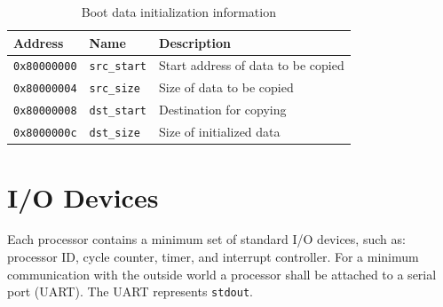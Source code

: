 \documentclass[a4paper,fontsize=10pt,twoside,DIV15,BCOR12mm,headinclude=true,footinclude=false,pagesize,bibtotoc]{scrbook}
\newcommand{\code}[1]{{\texttt{#1}}}
\newcommand{\comment}[3]{

\textsf{\textbf{#1}} {\color{#3}#2}}
\newcommand{\stefan}[1]{\comment{Stefan}{#1}{RoyalPurple}}
\renewcommand{\stefan}[1]{}
\begin{document}
\begin{table}
\centering
\begin{tabular}{lll}
\toprule
Address & Name & Description \\
\midrule
\code{0x80000000} & \code{src\_start} & Start address of data to be copied \\
\code{0x80000004} & \code{src\_size} & Size of data to be copied \\
\code{0x80000008} & \code{dst\_start} & Destination for copying \\
\code{0x8000000c} & \code{dst\_size} & Size of initialized data \\
\bottomrule
\end{tabular}
\caption{Boot data initialization information}
\label{tab:bootrommap}
\end{table}


\stefan{We discussed about making the stack cache memory mapped, like the SPM. The disadvantage is that
we need to reserve an additional register for the stack pointer of the stack cache. s5 (the stack cache spill pointer) must point into a main
memory address range. s6 (the stack top pointer) must point to the top of the stack cache in the cache address range and must be modifiable
(for context switching). An additional s7 must either contain the size of the stack cache or the tail pointer of the stack cache.

The advantage is we can then pass typed pointers to functions, similar to SPM pointers, if the caller stack frame is not evicted, in a first
step. As a second step, we can drop the typed loads and use the compiler to emit address range information to the WCET analysis.
A pointer into the stack cache address range is always guaranteed to be a hit (accessing an address that has been evicted is an error). We
can therefore get rid of function duplication depending on their pointer types. We basically move the information about the accessed memory from the
memory instruction to the pointer value, which can be context-sensitive.}

\section{I/O Devices}
\label{sec:iodevs}

Each processor contains a minimum set of standard I/O devices, such as:
processor ID, cycle counter, timer, and interrupt controller. For a minimum
communication with the outside world a processor shall be attached to a
serial port (UART). The UART represents \code{stdout}.
\end{document}
